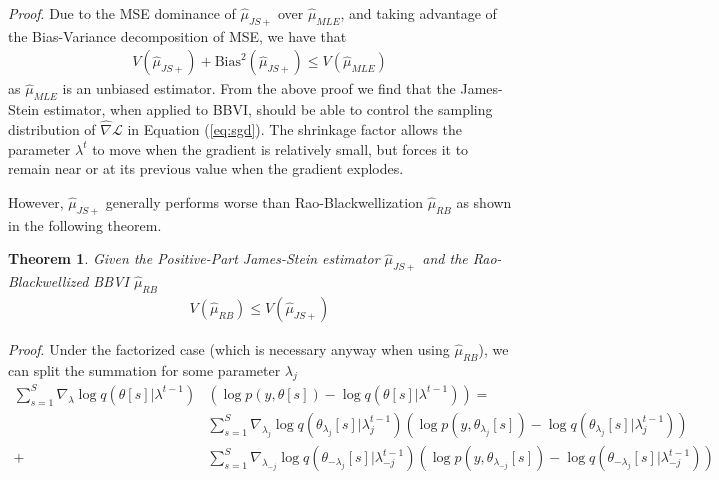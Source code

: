 \documentclass{article}
\newtheorem{theorem}{Theorem}
\begin{document}
\textit{Proof}. Due to the MSE dominance of $\hat\mu_{JS+}$ over $\hat\mu_{MLE}$, and taking advantage of the Bias-Variance decomposition of MSE, we have that
\begin{align*}
    V(\hat\mu_{JS+}) + \text{Bias}^2(\hat\mu_{JS+}) \leq  V(\hat\mu_{MLE})
\end{align*}
as $\hat\mu_{MLE}$ is an unbiased estimator. From the above proof we find that the James-Stein estimator, when applied to BBVI, should be able to control the sampling distribution of $\hat\nabla\mathcal{L}$ in Equation (\ref{eq:sgd}). The shrinkage factor allows the parameter $\lambda^{t}$ to move when the gradient is relatively small, but forces it to remain near or at its previous value when the gradient explodes.

However, $\hat\mu_{JS+}$ generally performs worse than Rao-Blackwellization $\hat\mu_{RB}$ as shown in the following theorem.

\begin{theorem}
    \label{thm:varcontrol2}
    Given the Positive-Part James-Stein estimator $\hat\mu_{JS+}$ and the Rao-Blackwellized BBVI $\hat\mu_{RB}$
    \begin{align*}
        V(\hat\mu_{RB}) \leq  V(\hat\mu_{JS+})
    \end{align*}
\end{theorem}

\textit{Proof}. Under the factorized case (which is necessary anyway when using $\hat\mu_{RB}$), we can split the summation for some parameter $\lambda_j$
\begin{align*}
\sum^{S}_{s=1} \nabla_{\lambda} \log q(\theta[s] | \lambda^{t-1}) & (\log p(y, \theta[s]) - \log q(\theta[s]|\lambda^{t-1}))  = \\
& \sum^{S}_{s=1} \nabla_{\lambda_j} \log q(\theta_{\lambda_j}[s] | \lambda^{t-1}_{j}) (\log p(y, \theta_{\lambda_j}[s]) - \log q(\theta_{\lambda_j}[s]|\lambda^{t-1}_j)) \\
+ & \sum^{S}_{s=1} \nabla_{\lambda_{-j}} \log q(\theta_{-\lambda_j}[s] | \lambda^{t-1}_{-j}) (\log p(y, \theta_{\lambda_{-j}}[s]) - \log q(\theta_{-\lambda_j}[s]|\lambda^{t-1}_{-j}))
\end{align*}
\end{document}
